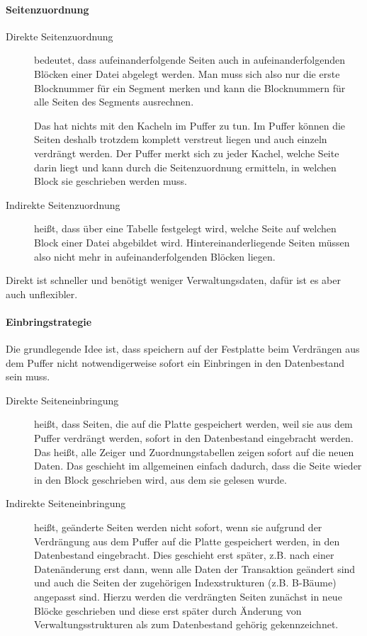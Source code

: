 \begin{enumerate}[a)]
\begin{solution}
	\paragraph{Seitenzuordnung}
	\begin{description}
		\item[Direkte Seitenzuordnung] bedeutet, dass aufeinanderfolgende Seiten auch in aufeinanderfolgenden Blöcken einer Datei abgelegt werden. Man muss sich also nur die erste Blocknummer für ein Segment merken und kann die Blocknummern für alle Seiten des Segments ausrechnen.

		Das hat nichts mit den Kacheln im Puffer zu tun. Im Puffer können die Seiten deshalb trotzdem komplett verstreut liegen und auch einzeln verdrängt werden. Der Puffer merkt sich zu jeder Kachel, welche Seite darin liegt und kann durch die Seitenzuordnung ermitteln, in welchen Block sie geschrieben werden muss.

		\item[Indirekte Seitenzuordnung] heißt, dass über eine Tabelle festgelegt wird, welche Seite auf welchen Block einer Datei abgebildet wird. Hintereinanderliegende Seiten müssen also nicht mehr in aufeinanderfolgenden Blöcken liegen.
	\end{description}

	Direkt ist schneller und benötigt weniger Verwaltungsdaten, dafür ist es aber auch unflexibler.

	\paragraph{Einbringstrategie}
	Die grundlegende Idee ist, dass speichern auf der Festplatte beim Verdrängen aus dem Puffer nicht notwendigerweise sofort ein Einbringen in den Datenbestand sein muss.

	\begin{description}
		\item[Direkte Seiteneinbringung] heißt, dass Seiten, die auf die Platte gespeichert werden, weil sie aus dem Puffer verdrängt werden, sofort in den Datenbestand eingebracht werden. Das heißt, alle Zeiger und Zuordnungstabellen zeigen sofort auf die neuen Daten. Das geschieht im allgemeinen einfach dadurch, dass die Seite wieder in den Block geschrieben wird, aus dem sie gelesen wurde.
		\item[Indirekte Seiteneinbringung] heißt, geänderte Seiten werden nicht sofort, wenn sie aufgrund der Verdrängung aus dem Puffer auf die Platte gespeichert werden, in den Datenbestand eingebracht. Dies geschieht erst später, z.B. nach einer Datenänderung erst dann, wenn alle Daten der Transaktion geändert sind und auch die Seiten der zugehörigen Indexstrukturen (z.B. B-Bäume) angepasst sind. Hierzu werden die verdrängten Seiten zunächst in neue Blöcke geschrieben und diese erst später durch Änderung von Verwaltungsstrukturen als zum Datenbestand gehörig gekennzeichnet.
	\end{description}


\end{solution}
\end{enumerate}
